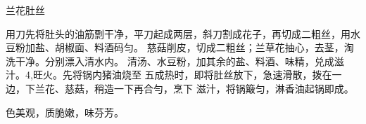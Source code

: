 \begin{recipe}{兰花肚丝}

\ingredients


\cooking

\step 用刀先将肚头的油筋剽干净，平刀起成两层，斜刀割成花子，再切成二粗丝，用水
豆粉加盐、胡椒面、料酒码匀。
\step 慈菇削皮，切成二粗丝；兰草花抽心，去茎，淘洗干净。分别漂入清水内。
\step 清汤、水豆粉，加其余的盐、料酒、味精，兑成滋汁。4,旺火。先将锅内猪油烧至
五成热时，即将肚丝放下，急速滑散，拨在一边，下兰花、慈菇，稍造一下再合勻，烹下
滋汁，将锅簸匀，淋香油起锅即成。

\notes

色美观，质脆嫩，味芬芳。

\end{recipe}

